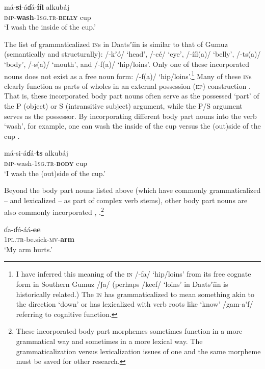 \documentclass[output=paper]{langsci/langscibook}
\begin{document}
\ea\label{ex:ahlandc:11}
\gll 
m\'{a}-\textbf{si}{}-\'{a}ɗ\'{a}-\textbf{\'{i}\'{i}l}  alkub\'{a}j \\
\textsc{imp}{}-\textbf{wash}{}-\textsc{1sg.tr-}\textbf{\textsc{belly}}     cup \\
\glt
‘I wash the inside of the cup.’
\z

The list of grammaticalized \textsc{in}s in Daatsʼ\'{i}in is  similar to that of Gumuz (semantically and structurally): /-kʼ\'{o}/ ‘head’, /-c\'{e}/ ‘eye’, /-\'{i}\'{i}l(a)/ ‘belly’, /-ts(a)/ ‘body’, /-s(a)/ ‘mouth’, and /-f(a)/ ‘hip/loins’. Only one of these incorporated nouns does not exist as a free noun form: /-f(a)/ ‘hip/loins’.\footnote{ I have inferred this meaning of the \textsc{in }/-fa/ ‘hip/loins’ from its free cognate form in Southern Gumuz /ʃa/ (perhaps /keef/ ‘loins’ in Daatsʼ\'{i}in is historically related.) The \textsc{in }has grammaticalized to mean something akin to the direction ‘down’ or has lexicalized with verb roots like ‘know’ /gam-a\'{ }f/ referring to cognitive function.} Many of these \textsc{in}s clearly function as parts of wholes in an external possession (\textsc{ep}) construction \citep{PayneBarshi1999}. That is, these incorporated body part nouns often serve as the possessed ‘part’ of the P (object) or S (intransitive subject) argument, while the P/S argument serves as the possessor. By incorporating different body part nouns into the verb ‘wash’, for example, one can wash the inside of the cup  versus the (out)side of the cup .  

\ea\label{ex:ahlandc:12}
\gll
m\'{a}-si-\'{a}ɗ\'{a}-\textbf{ts}    alkub\'{a}j \\
\textsc{imp}{}-wash{}-\textsc{1sg.tr-}\textbf{\textsc{body}}   cup \\
\glt
‘I wash the (out)side of the cup.’
\z

Beyond the body part nouns listed above (which have commonly grammaticalized – and lexicalized – as part of complex verb stems), other body part nouns are also commonly incorporated , .\footnote{These incorporated body part morphemes sometimes function in a more grammatical way and sometimes in a more lexical way. The grammaticalization versus lexicalization issues of one and the same morpheme must be saved for other research.}

\ea\label{ex:ahlandc:13}
\gll
ɗa-ɗ\'{u}-\'{a}\'{a}-\textbf{ee}   \\
\textsc{1pl.tr}{}-be.sick-\textsc{mv}{}-\textbf{arm} \\
\glt
‘My arm hurts.’
\z
\end{document}
